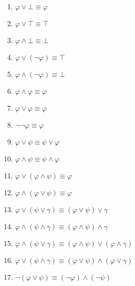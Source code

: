 \documentclass[a4paper]{article}
\begin{document}
\begin{enumerate}
\begin{enumerate}[label*=\arabic*.]
  \item\label{eq3} $\varphi \lor \bot \equiv \varphi$
    
  \item\label{eq4} $\varphi \lor \top \equiv \top$
    
  \item\label{eq5} $\varphi \land \bot \equiv \bot$
    
  \item\label{eq6} $\varphi \lor (\neg{} \varphi) \equiv \top$
    
  \item\label{eq7} $\varphi \land (\neg{} \varphi) \equiv \bot$
    
  \item\label{eq8} $\varphi \land \varphi \equiv \varphi$
    
  \item\label{eq9} $\varphi \lor \varphi \equiv \varphi$
    
  \item\label{eq10} $\neg{} \neg{} \varphi \equiv \varphi$
    
  \item\label{eq11} $\varphi \lor \psi \equiv \psi \lor \varphi$
    
  \item\label{eq12} $\varphi \land \psi \equiv \psi \land \varphi$
    
  \item\label{eq13} $\varphi \lor (\varphi \land \psi) \equiv \varphi$
    
  \item\label{eq14} $\varphi \land (\varphi \lor \psi) \equiv \varphi$
    
  \item\label{eq15} $\varphi \lor (\psi \lor \gamma) \equiv (\varphi \lor \psi)  \lor \gamma$
    
  \item\label{eq16} $\varphi \land (\psi \land \gamma) \equiv (\varphi \land \psi)  \land \gamma$
    
  \item\label{eq17} $\varphi \land (\psi \lor \gamma) \equiv (\varphi \land \psi) \lor (\varphi \land \gamma)$
    
  \item\label{eq18} $\varphi \lor (\psi \land \gamma) \equiv (\varphi \lor \psi) \land (\varphi \lor \gamma)$
    
  \item\label{eq19} $\neg{}(\varphi \lor \psi) \equiv (\neg{} \varphi) \land (\neg{} \psi)$
    

\end{enumerate}
\end{enumerate}
\end{document}
